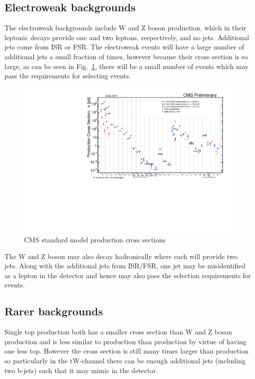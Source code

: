 \subsection{Electroweak backgrounds}
The electroweak backgrounds include W and Z boson production, which in their leptonic decays provide one and two leptons, respectively, and no jets. Additional jets come from ISR or FSR. The electroweak events will have a large number of additional jets a small fraction of times, however because their cross section is so large, as can be seen in Fig.~\ref{fig:CMSstairway}, there will be a small number of events which may pass the requirements for selecting \tttt events.
\begin{figure}[ht!]
\begin{center}
    \includegraphics[width=0.99\textwidth]{images/Theory/stairway.pdf}
    \caption{CMS standard model production cross sections~\cite{stairwaytwiki}}
    \label{fig:CMSstairway}
\end{center}
\end{figure}

The W and Z boson may also decay hadronically where each will provide two jets. Along with the additional jets from ISR/FSR, one jet may be misidentified as a lepton in the detector and hence may also pass the selection requirements for \tttt events.

\subsection{Rarer backgrounds}
Single top production both has a smaller cross section than W and Z boson production and is less similar to \tttt production than \ttbar production by virtue of having one less top. However the cross section is still many times larger than \tttt production so particularly in the tW-channel there can be enough additional jets (including two b-jets) such that it may mimic \tttt in the detector.

